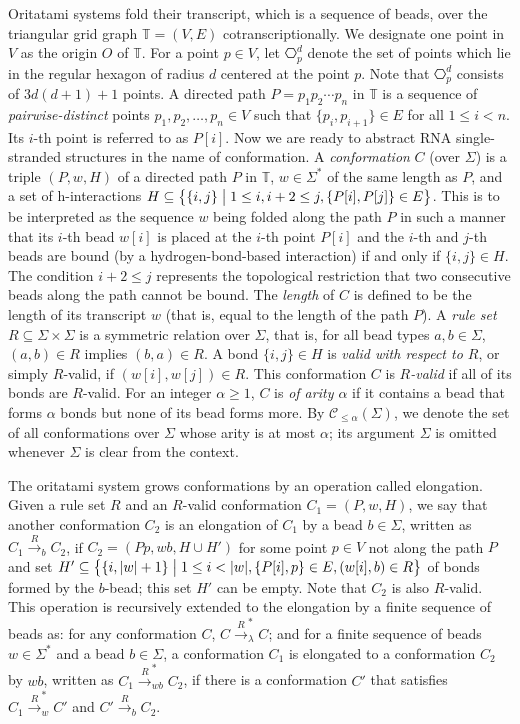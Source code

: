 \documentclass[runningheads]{llncs}
\begin{document}
Oritatami systems fold their transcript, which is a sequence of beads, over the triangular grid graph $\mathbb{T} = (V, E)$ cotranscriptionally. 
We designate one point in $V$ as the origin $O$ of $\mathbb{T}$. 
For a point $p \in V$, let $\hexagon_p^d$ denote the set of points which lie in the regular hexagon of radius $d$ centered at the point $p$. 
Note that $\hexagon_p^d$ consists of $3d(d+1)+1$ points. 
A directed path $P = p_1 p_2 \cdots p_n$ in $\mathbb{T}$ is a sequence of \textit{pairwise-distinct} points $p_1, p_2, \ldots, p_n \in V$ such that $\{p_i, p_{i+1}\} \in E$ for all $1 \le i < n$. 
Its $i$-th point is referred to as $P[i]$. 
Now we are ready to abstract RNA single-stranded structures in the name of conformation. 
A \textit{conformation} $C$ (over $\Sigma$) is a triple $(P, w, H)$ of a directed path $P$ in $\mathbb{T}$, $w \in \Sigma^*$ of the same length as $P$, and a set of h-interactions $H \subseteq \bigl\{\{i, j\} \bigm| 1 \le i, i+2 \le j, \{P[i], P[j]\} \in E \bigr\}$. 
This is to be interpreted as the sequence $w$ being folded along the path $P$ in such a manner that its $i$-th bead $w[i]$ is placed at the $i$-th point $P[i]$ and the $i$-th and $j$-th beads are bound (by a hydrogen-bond-based interaction) if and only if $\{i, j\} \in H$. 
The condition $i+2 \le j$ represents the topological restriction that two consecutive beads along the path cannot be bound. 
The \textit{length} of $C$ is defined to be the length of its transcript $w$ (that is, equal to the length of the path $P$). 
A \textit{rule set} $R \subseteq \Sigma \times \Sigma$ is a symmetric relation over $\Sigma$, that is, for all bead types $a, b \in \Sigma$, $(a, b) \in R$ implies $(b, a) \in R$. 
A bond $\{i, j\} \in H$ is \textit{valid with respect to $R$}, or simply $R$-valid, if $(w[i], w[j]) \in R$. 
This conformation $C$ is \textit{$R$-valid} if all of its bonds are $R$-valid. 
For an integer $\alpha \ge 1$, $C$ is \textit{of arity $\alpha$} if it contains a bead that forms $\alpha$ bonds but none of its bead forms more. 
By $\mathcal{C}_{\le \alpha}(\Sigma)$, we denote the set of all conformations over $\Sigma$ whose arity is at most $\alpha$; its argument $\Sigma$ is omitted whenever $\Sigma$ is clear from the context. 

The oritatami system grows conformations by an operation called elongation. 
Given a rule set $R$ and an $R$-valid conformation $C_1 = (P, w, H)$, we say that another conformation $C_2$ is an elongation of $C_1$ by a bead $b \in \Sigma$, written as $C_1 \xrightarrow{R}_b C_2$, if $C_2 = (P p, wb, H \cup H')$ for some point $p \in V$ not along the path $P$ and set $H' \subseteq \bigl\{ \{i, |w|+1\} \bigm| 1 \le i < |w|, \{P[i], p\} \in E, (w[i], b) \in R \bigr\}$ of bonds formed by the $b$-bead; this set $H'$ can be empty. 
Note that $C_2$ is also $R$-valid. 
This operation is recursively extended to the elongation by a finite sequence of beads as: for any conformation $C$, $C \xrightarrow{R}_\lambda^* C$; and for a finite sequence of beads $w \in \Sigma^*$ and a bead $b \in \Sigma$, a conformation $C_1$ is elongated to a conformation $C_2$ by $wb$, written as $C_1 \xrightarrow{R}_{wb}^* C_2$, if there is a conformation $C'$ that satisfies $C_1 \xrightarrow{R}_w^* C'$ and $C' \xrightarrow{R}_b C_2$. 
\end{document}
